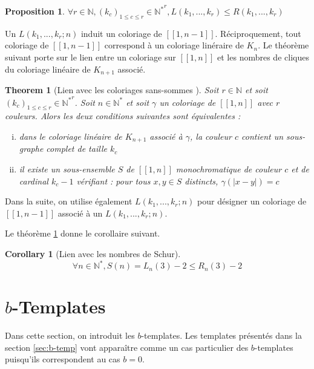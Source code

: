 \documentclass{article}
\newtheorem{theorem}[definition]{Theorem}
\newtheorem{corollary}[definition]{Corollary}
\newtheorem{proposition}[definition]{Proposition}
\begin{document}
\begin{proposition}
\(\forall r \in \mathbb{N}, (k_c)_{1 \leqslant c \leqslant r} \in {\mathbb{N}^*}^r, L(k_1, ..., k_r) \leqslant R(k_1, ..., k_r)\)
\end{proposition}

Un \(L(k_1, ..., k_r ; n)\) induit un coloriage de \([\![1, n - 1]\!]\). Réciproquement, tout coloriage de \([\![1, n - 1]\!]\) correspond à un coloriage linéraire de \(K_n\). Le théorème suivant porte sur le lien entre un coloriage sur \([\![1, n]\!]\) et les nombres de cliques du coloriage linéaire de \(K_{n+1}\) associé.

\begin{theorem}[Lien avec les coloriages sans-sommes \cite{AbbottHanson}]
\label{thm:lien-partitions}
Soit \(r \in \mathbb{N}\) et soit \((k_c)_{1 \leqslant c \leqslant r} \in {\mathbb{N}^*}^r\). Soit \(n \in \mathbb{N}^*\) et soit \(\gamma\) un coloriage de \([\![1, n]\!]\) avec \(r\) couleurs. Alors les deux conditions suivantes sont équivalentes :
\begin{enumerate}[(i)]
\item dans le coloriage linéaire de \(K_{n+1}\) associé à \(\gamma\), la couleur \(c\) contient un sous-graphe complet de taille \(k_c\)
\item il existe un sous-ensemble \(S\) de \([\![1, n]\!]\) monochromatique de couleur \(c\) et de cardinal \(k_c - 1\) vérifiant : pour tous \(x, y \in S\) distincts, \(\gamma(|x - y|) = c\) 
\end{enumerate}
\end{theorem}

Dans la suite, on utilise également \(L(k_1, ..., k_r ; n)\) pour désigner un coloriage de \([\![1, n - 1]\!]\)  associé à un \(L(k_1, ..., k_r ; n)\).

Le théorème \ref{thm:lien-partitions} donne le corollaire suivant.

\begin{corollary}[Lien avec les nombres de Schur]
\[\forall n \in \mathbb{N}^*, S(n) = L_n(3) - 2 \leqslant R_n(3) - 2\] 
\end{corollary}

\section{\(b\)-Templates}
\label{sec:temp}
Dans cette section, on introduit les \(b\)-templates. Les templates présentés dans la section \ref{sec:b-temp} vont apparaître comme un cas particulier des \(b\)-templates puisqu'ils correspondent au cas \(b = 0\).
\end{document}
